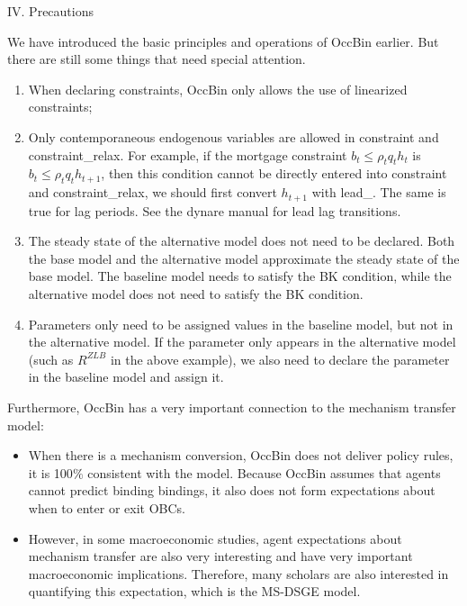 \documentclass[10pt,math=newtx,citestyle=gb7714-2015,bibstyle=gb7714-2015]{elegantbook}
\begin{document}
{IV. Precautions

We have introduced the basic principles and operations of OccBin earlier. But there are still some things that need special attention.
\begin{enumerate}
	
	\item When declaring constraints, OccBin only allows the use of linearized constraints;
	
	\item Only contemporaneous endogenous variables are allowed in constraint and constraint\_relax. For example, if the mortgage constraint $b_t\le\rho_tq_th_t$ is $b_t\le\rho_tq_th_{t+1}$, then this condition cannot be directly entered into constraint and constraint\_relax, we should first convert $h_{t+1}$ with lead\_. The same is true for lag periods. See the dynare manual for lead lag transitions.
	
	\item The steady state of the alternative model does not need to be declared. Both the base model and the alternative model approximate the steady state of the base model. The baseline model needs to satisfy the BK condition, while the alternative model does not need to satisfy the BK condition.
	
	\item Parameters only need to be assigned values in the baseline model, but not in the alternative model. If the parameter only appears in the alternative model (such as $R^{ZLB}$ in the above example), we also need to declare the parameter in the baseline model and assign it.
	
\end{enumerate}


Furthermore, OccBin has a very important connection to the mechanism transfer model:
\begin{itemize}
	\item When there is a mechanism conversion, OccBin does not deliver policy rules, it is 100$\%$ consistent with the model. Because OccBin assumes that agents cannot predict binding bindings, it also does not form expectations about when to enter or exit OBCs.
	
	\item However, in some macroeconomic studies, agent expectations about mechanism transfer are also very interesting and have very important macroeconomic implications. Therefore, many scholars are also interested in quantifying this expectation, which is the MS-DSGE model.
	

\end{itemize}}
\end{document}
